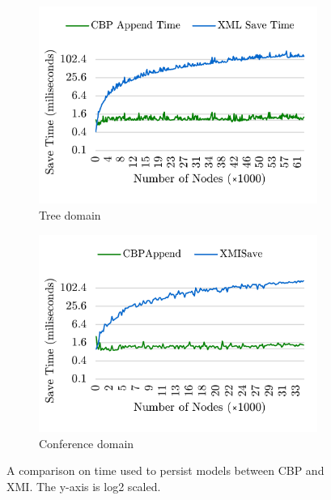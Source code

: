 \documentclass{llncs}
\begin{document}
\begin{figure}[ht]	
	\begin{subfigure}[t]{0.5\linewidth}
		\includegraphics[width=\linewidth]{append_speed_tree}
		\caption{Tree domain}\label{fig:append_speed_tree}		
	\end{subfigure}
	\hfill
	\begin{subfigure}[t]{0.5\linewidth}
		\includegraphics[width=\linewidth]{append_speed_conf}
		\caption{Conference domain}\label{fig:append_speed_conference}
	\end{subfigure}
	\caption{A comparison on time used to persist models between CBP and XMI. The y-axis is log\textsc{2} scaled.}
	\label{fig:append_speed}
\end{figure}
\end{document}
